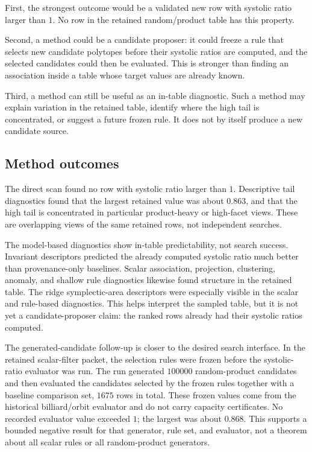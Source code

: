 First, the strongest outcome would be a validated new row with systolic ratio
larger than \(1\).  No row in the retained random/product table has this
property.

Second, a method could be a candidate proposer: it could freeze a rule that
selects new candidate polytopes before their systolic ratios are computed, and
the selected candidates could then be evaluated.  This is stronger than finding
an association inside a table whose target values are already known.

Third, a method can still be useful as an in-table diagnostic.  Such a method
may explain variation in the retained table, identify where the high tail is
concentrated, or suggest a future frozen rule.  It does not by itself produce a
new candidate source.

\subsection{Method outcomes}
\label{subsec:black-box-datascience-method-outcomes}

The direct scan found no row with systolic ratio larger than \(1\).  Descriptive
tail diagnostics found that the largest retained value was about \(0.863\), and
that the high tail is concentrated in particular product-heavy or high-facet
views.  These are overlapping views of the same retained rows, not independent
searches.

The model-based diagnostics show in-table predictability, not search success.
Invariant descriptors predicted the already computed systolic ratio much better
than provenance-only baselines.  Scalar association, projection, clustering,
anomaly, and shallow rule diagnostics likewise found structure in the retained
table.  The ridge symplectic-area descriptors were especially visible in the
scalar and rule-based diagnostics.  This helps interpret the sampled table, but
it is not yet a candidate-proposer claim: the ranked rows already had their
systolic ratios computed.

The generated-candidate follow-up is closer to the desired search interface.
In the retained scalar-filter packet, the selection rules were frozen before
the systolic-ratio evaluator was run.  The run generated \(100000\) random-product
candidates and then evaluated the candidates selected by the frozen rules
together with a baseline comparison set, \(1675\) rows in total.  These frozen
values come from the historical billiard/orbit evaluator and do not carry
capacity certificates.  No recorded evaluator value
exceeded \(1\); the largest was about \(0.868\).  This supports a bounded
negative result for that generator, rule set, and evaluator, not a theorem
about all scalar rules or all random-product generators.

